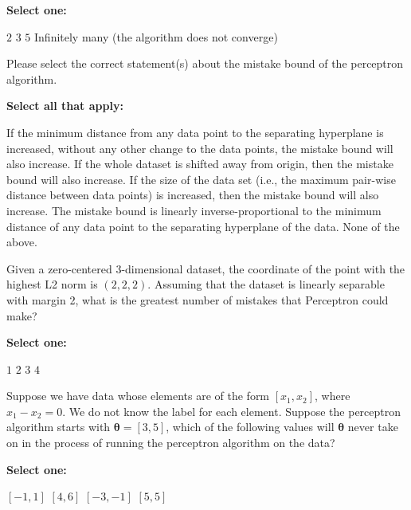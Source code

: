 \documentclass[11pt,addpoints,answers]{exam}
\numberwithin{equation}{section} %
\numberwithin{figure}{section} %
\numberwithin{table}{section} %
\begin{document}
\begin{questions}
    \textbf{Select one:}
    \begin{checkboxes}
        \choice $2$
        \CorrectChoice $3$
        \choice $5$
        \choice Infinitely many (the algorithm does not converge)
    \end{checkboxes}

    
    
        
    
    \question[3] Please select the correct statement(s) about the mistake bound of the perceptron algorithm. 

    \textbf{Select all that apply:}
    {%
    \checkboxchar{$\Box$} \checkedchar{$\blacksquare$}
    \begin{checkboxes}
        \CorrectChoice If the minimum distance from any data point to the separating hyperplane is increased, without any other change to the data points, the mistake bound will also increase.
        \choice If the whole dataset is shifted away from origin, then the mistake bound will also increase.
        \choice If the size of the data set (i.e., the maximum pair-wise distance between data points) is increased, then the mistake bound will also increase.
        \CorrectChoice The mistake bound is linearly inverse-proportional to the minimum distance of any data point to the separating hyperplane of the data.
        \choice None of the above.
    \end{checkboxes}
    }



    \question[2] Given a zero-centered 3-dimensional dataset, the coordinate of the point with the highest L2 norm is $(2, 2, 2)$. Assuming that the dataset is linearly separable with margin 2, what is the greatest number of mistakes that Perceptron could make?

    \textbf{Select one:}
    \begin{checkboxes}
        \choice $1$
        \CorrectChoice $2$
        \choice $3$
        \choice $4$
    \end{checkboxes}




\newpage
    \question[2] Suppose we have data whose elements are of the form $[x_1,x_2]$, where $x_1 - x_2 = 0$. We do not know the label for each element. Suppose the perceptron algorithm starts with $\bm{\theta} = [3,5]$, which of the following values will $\bm{\theta}$ never take on in the process of running the perceptron algorithm on the data?

    \textbf{Select one:}
    \begin{checkboxes}
        \choice $[-1,1]$
        \choice $[4,6]$
        \choice $[-3,-1]$
        \CorrectChoice $[5,5]$
    \end{checkboxes}


\end{questions}
\end{document}
